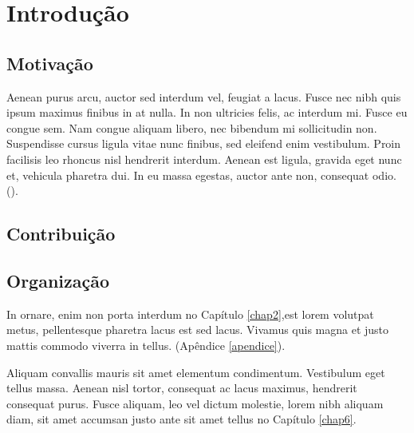 \chapter{Introdução}

\section{Motivação}

Aenean purus arcu, auctor sed interdum vel, feugiat a lacus. Fusce nec nibh quis ipsum maximus finibus in at nulla. In non ultricies felis, ac interdum mi. Fusce eu congue sem. Nam congue aliquam libero, nec bibendum mi sollicitudin non. Suspendisse cursus ligula vitae nunc finibus, sed eleifend enim vestibulum. Proin facilisis leo rhoncus nisl hendrerit interdum. Aenean est ligula, gravida eget nunc et, vehicula pharetra dui. In eu massa egestas, auctor ante non, consequat odio. (\cite{alvim2007}).

\section{Contribuição}

\section{Organização}

In ornare, enim non porta interdum no Capítulo \ref{chap2},est lorem volutpat metus, pellentesque pharetra lacus est sed lacus. Vivamus quis magna et justo mattis commodo viverra in tellus. (Apêndice \ref{apendice}).

Aliquam convallis mauris sit amet elementum condimentum. Vestibulum eget tellus massa. Aenean nisl tortor, consequat ac lacus maximus, hendrerit consequat purus. Fusce aliquam, leo vel dictum molestie, lorem nibh aliquam diam, sit amet accumsan justo ante sit amet tellus no Capítulo \ref{chap6}.